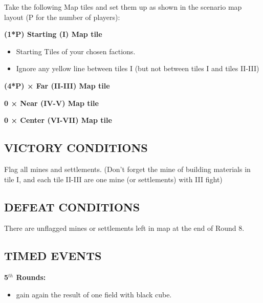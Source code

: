 \begin{multicols*}{2}
Take the following Map tiles and set them up as shown in the scenario map layout (P for the number of players):

\textbf{(1*P) Starting (I) Map tile}
\begin{itemize}
  \item Starting Tiles of your chosen factions.
  \item Ignore any yellow line between tiles I (but not between tiles I and tiles II-III)
\end{itemize}

\textbf{(4*P) × Far (II-III) Map tile}

\textbf{0 × Near (IV-V) Map tile}

\textbf{0 × Center (VI-VII) Map tile}

\subsection*{\MakeUppercase{Victory Conditions}}

Flag all mines and settlements. (Don't forget the mine of building materials in tile I, and each tile II-III are one mine (or settlements) with III fight)

\subsection*{\MakeUppercase{Defeat Conditions}}

There are unflagged mines or settlements left in map at the end of Round 8.

\subsection*{\MakeUppercase{Timed Events}}

\textbf{5$^{th}$ Rounds:}
\begin{itemize}
  \item gain again the result of one field with black cube.
\end{itemize}


\end{multicols*}
